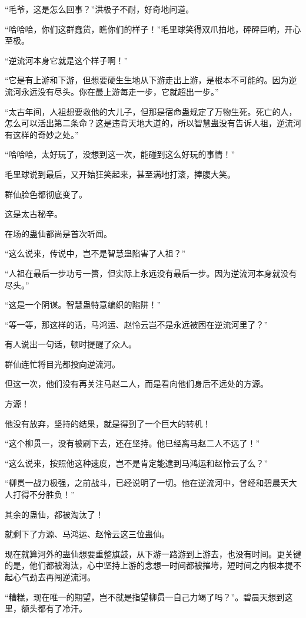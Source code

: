 \begin{this_body}
“毛爷，这是怎么回事？”洪极子不耐，好奇地问道。

“哈哈哈，你们这群蠢货，瞧你们的样子！”毛里球笑得双爪拍地，砰砰巨响，开心至极。

“逆流河本身它就是这个样子啊！”

“它是有上游和下游，但想要硬生生地从下游走出上游，是根本不可能的。因为逆流河永远没有尽头。你在最上游每走一步，它就超出一步。”

“太古年间，人祖想要救他的大儿子，但那是宿命蛊规定了万物生死。死亡的人，怎么可以活出第二条命？这是违背天地大道的，所以智慧蛊没有告诉人祖，逆流河有这样的奇妙之处。”

“哈哈哈，太好玩了，没想到这一次，能碰到这么好玩的事情！”

毛里球说到最后，又开始狂笑起来，甚至满地打滚，捧腹大笑。

群仙脸色都彻底变了。

这是太古秘辛。

在场的蛊仙都尚是首次听闻。

“这么说来，传说中，岂不是智慧蛊陷害了人祖？”

“人祖在最后一步功亏一篑，但实际上永远没有最后一步。因为逆流河本身就没有尽头。”

“这是一个阴谋。智慧蛊特意编织的陷阱！”

“等一等，那这样的话，马鸿运、赵怜云岂不是永远被困在逆流河里了？”

有人说出一句话，顿时提醒了众人。

群仙连忙将目光都投向逆流河。

但这一次，他们没有再关注马赵二人，而是看向他们身后不远处的方源。

方源！

他没有放弃，坚持的结果，就是得到了一个巨大的转机！

“这个柳贯一，没有被刷下去，还在坚持。他已经离马赵二人不远了！”

“这么说来，按照他这种速度，岂不是肯定能逮到马鸿运和赵怜云了么？”

“柳贯一战力极强，之前战斗，已经说明了一切。他在逆流河中，曾经和碧晨天大人打得不分胜负！”

其余的蛊仙，都被淘汰了！

就剩下了方源、马鸿运、赵怜云这三位蛊仙。

现在就算河外的蛊仙想要重整旗鼓，从下游一路游到上游去，也没有时间。更关键的是，他们都被淘汰，心中坚持上游的念想一时间都被摧垮，短时间之内根本提不起心气劲去再闯逆流河。

“糟糕，现在唯一的期望，岂不就是指望柳贯一自己力竭了吗？”。碧晨天想到这里，额头都有了冷汗。


\end{this_body}
